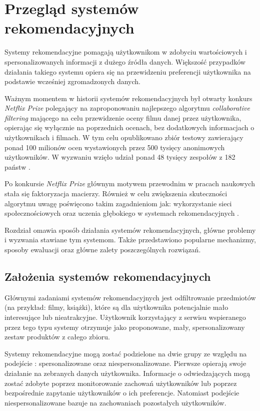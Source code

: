 
\chapter{Przegląd systemów rekomendacyjnych}

Systemy rekomendacyjne pomagają użytkownikom w zdobyciu wartościowych i spersonalizowanych informacji z dużego źródła danych. Większość przypadków działania takiego systemu opiera się na przewidzeniu preferencji użytkownika na podstawie wcześniej zgromadzonych danych.

Ważnym momentem w historii systemów rekomendacyjnych był otwarty konkurs \textit{Netflix Prize} polegający na zaproponowaniu najlepszego algorytmu \textit{collaborative filtering} mającego na celu przewidzenie oceny filmu danej przez użytkownika, opierając się wyłącznie na poprzednich ocenach, bez dodatkowych informacjach o użytkownikach i filmach. W tym celu opublikowano zbiór testowy zawierający ponad 100 milionów ocen wystawionych przez 500 tysięcy anonimowych użytkowników. W wyzwaniu wzięło udział ponad 48 tysięcy zespołów z 182 państw \cite{netflix_prize}.

Po konkursie \textit{Netflix Prize} głównym motywem przewodnim w pracach naukowych stała się faktoryzacja macierzy. Również w celu zwiększenia skuteczności algorytmu uwagę poświęcono takim zagadnieniom jak: wykorzystanie sieci społecznościowych oraz uczenia głębokiego w systemach rekomendacyjnych \cite{recent_developments}.

Rozdział omawia sposób działania systemów rekomendacyjnych, główne problemy i wyzwania stawiane tym systemom. Także przedstawiono popularne mechanizmy, sposoby ewaluacji oraz główne zalety poszczególnych rozwiązań.

\section{Założenia systemów rekomendacyjnych}

Głównymi zadaniami systemów rekomendacyjnych jest odfiltrowanie przedmiotów (na przykład: filmy, książki), które są dla użytkownika potencjalnie mało interesujące lub nieatrakcyjne. Użytkownik korzystający z serwisu wspieranego przez tego typu systemy otrzymuje jako proponowane, mały, spersonalizowany zestaw produktów z całego zbioru.

Systemy rekomendacyjne mogą zostać podzielone na dwie grupy ze względu na podejście \cite{recent_developments}: spersonalizowane oraz niespersonalizowane. Pierwsze opierają swoje działanie na zebranych danych użytkownika. Informacje o odwiedzających mogą zostać zdobyte poprzez monitorowanie zachowań użytkowników lub poprzez bezpośrednie zapytanie użytkowników o ich preferencje. Natomiast podejście niespersonalizowane bazuje na zachowaniach pozostałych użytkowników.

